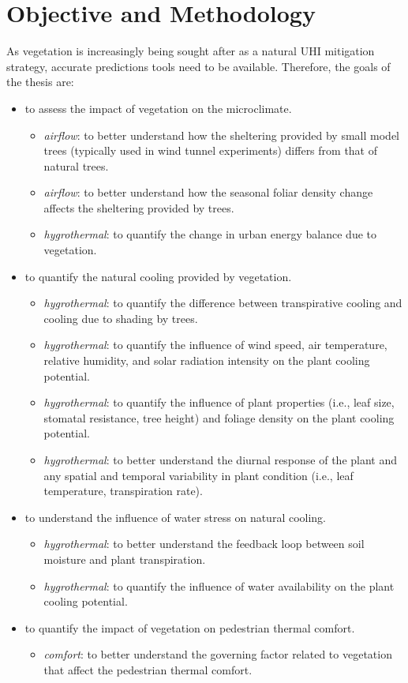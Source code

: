 \section{Objective and Methodology}


As vegetation is increasingly being sought after as a natural UHI mitigation strategy, accurate predictions tools need to be available. Therefore, the goals of the thesis are:

\begin{itemize}
	\item to assess the impact of vegetation on the microclimate.
	\begin{itemize}
		\item \textit{airflow}: to better understand how the sheltering provided by small model trees (typically used in wind tunnel experiments) differs from that of natural trees.
		\item \textit{airflow}: to better understand how the seasonal foliar density change affects the sheltering provided by trees.
		\item \textit{hygrothermal}: to quantify the change in urban energy balance due to vegetation.
	\end{itemize}
	\item to quantify the natural cooling provided by vegetation.
		\begin{itemize}
		\item \textit{hygrothermal}: to quantify the difference between transpirative cooling and cooling due to shading by trees.
			\item \textit{hygrothermal}: to quantify the influence of wind speed, air temperature, relative humidity, and solar radiation intensity on the plant cooling potential.					
			\item \textit{hygrothermal}: to quantify the influence of plant properties (i.e., leaf size, stomatal resistance, tree height) and foliage density on the plant cooling potential.			
			\item \textit{hygrothermal}: to better understand the diurnal response of the plant and any spatial and temporal variability in plant condition (i.e., leaf temperature, transpiration rate).	
		\end{itemize}		
	\item to understand the influence of water stress on natural cooling.
		\begin{itemize}
			\item \textit{hygrothermal}: to better understand the feedback loop between soil moisture and plant transpiration.			
			\item \textit{hygrothermal}: to quantify the influence of water availability on the plant cooling potential.
		\end{itemize}
	\item to quantify the impact of vegetation on pedestrian thermal comfort.
		\begin{itemize}
			\item \textit{comfort}: to better understand the governing factor related to vegetation that affect the pedestrian thermal comfort. 				
		\end{itemize}
\end{itemize}



